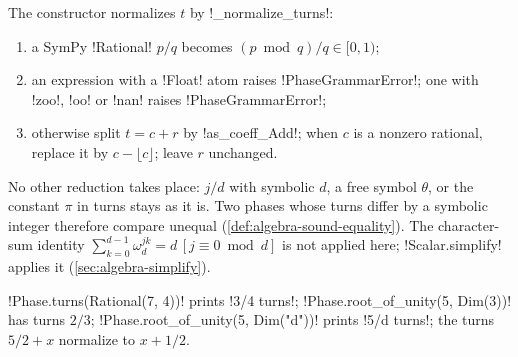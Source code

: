 \begin{definition}\label{def:algebra-turn-normal}
The constructor normalizes $t$ by \py!_normalize_turns!:
\begin{enumerate}
\item a SymPy \py!Rational! $p/q$ becomes $(p \bmod q)/q\in[0,1)$;
\item an expression with a \py!Float! atom raises \py!PhaseGrammarError!; one with \py!zoo!, \py!oo! or \py!nan! raises \py!PhaseGrammarError!;
\item otherwise split $t=c+r$ by \py!as_coeff_Add!; when $c$ is a nonzero rational, replace it by $c-\lfloor c\rfloor$; leave $r$ unchanged.
\end{enumerate}
\end{definition}

No other reduction takes place: $j/d$ with symbolic $d$, a free symbol $\theta$, or the constant $\pi$ in turns stays as it is. Two phases whose turns differ by a symbolic integer therefore compare unequal (\cref{def:algebra-sound-equality}). The character-sum identity $\sum_{k=0}^{d-1}\omega_d^{jk}=d\,[j\equiv 0 \bmod d]$ is not applied here; \py!Scalar.simplify! applies it (\cref{sec:algebra-simplify}).

\begin{example}
\py!Phase.turns(Rational(7, 4))! prints \code!3/4 turns!; \py!Phase.root_of_unity(5, Dim(3))! has turns $2/3$; \py!Phase.root_of_unity(5, Dim("d"))! prints \code!5/d turns!; the turns $5/2+x$ normalize to $x+1/2$.
\end{example}


